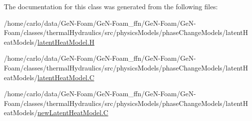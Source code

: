 The documentation for this class was generated from the following files\+:\begin{DoxyCompactItemize}
\item 
/home/carlo/data/\+Ge\+N-\/\+Foam/\+Ge\+N-\/\+Foam\+\_\+ffn/\+Ge\+N-\/\+Foam/\+Ge\+N-\/\+Foam/classes/thermal\+Hydraulics/src/physics\+Models/phase\+Change\+Models/latent\+Heat\+Models/\hyperlink{latentHeatModel_8H}{latent\+Heat\+Model.\+H}\item 
/home/carlo/data/\+Ge\+N-\/\+Foam/\+Ge\+N-\/\+Foam\+\_\+ffn/\+Ge\+N-\/\+Foam/\+Ge\+N-\/\+Foam/classes/thermal\+Hydraulics/src/physics\+Models/phase\+Change\+Models/latent\+Heat\+Models/\hyperlink{latentHeatModel_8C}{latent\+Heat\+Model.\+C}\item 
/home/carlo/data/\+Ge\+N-\/\+Foam/\+Ge\+N-\/\+Foam\+\_\+ffn/\+Ge\+N-\/\+Foam/\+Ge\+N-\/\+Foam/classes/thermal\+Hydraulics/src/physics\+Models/phase\+Change\+Models/latent\+Heat\+Models/\hyperlink{newLatentHeatModel_8C}{new\+Latent\+Heat\+Model.\+C}\end{DoxyCompactItemize}

